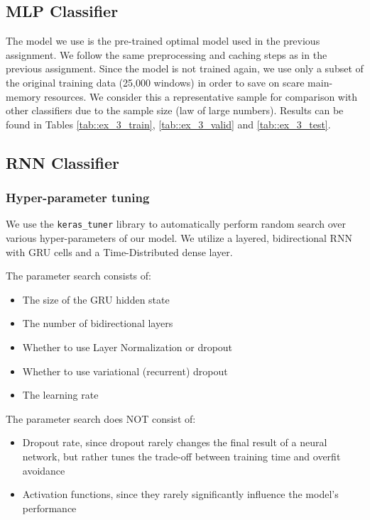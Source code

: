 \documentclass[10pt, a4paper]{article}
\begin{document}
	
	\subsection{MLP Classifier}
	
	The model we use is the pre-trained optimal model used in the previous assignment. We follow the same preprocessing and caching steps as in the previous assignment. Since the model is not trained again, we use only a subset of the original training data (25,000 windows) in order to save on scare main-memory resources. We consider this a representative sample for comparison with other classifiers due to the sample size (law of large numbers). Results can be found in Tables \ref{tab::ex_3_train}, \ref{tab::ex_3_valid} and \ref{tab::ex_3_test}.
	
	
	\subsection{RNN Classifier}
	
	\subsubsection{Hyper-parameter tuning}
	
	We use the \texttt{keras\_tuner} library to automatically perform random search over various hyper-parameters of our model. We utilize a layered, bidirectional RNN with GRU cells and a Time-Distributed dense layer. 
	
	The parameter search consists of:
	\begin{itemize}
		\item The size of the GRU hidden state
		\item The number of bidirectional layers
		\item Whether to use Layer Normalization or dropout
		\item Whether to use variational (recurrent) dropout
		\item The learning rate
	\end{itemize}
	
	
	The parameter search does NOT consist of:
	\begin{itemize}
		\item Dropout rate, since dropout rarely changes the final result of a neural network, but rather tunes the trade-off between training time and overfit avoidance
		\item Activation functions, since they rarely significantly influence the model's performance
	\end{itemize}
	
\end{document}
